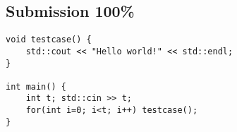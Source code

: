 \documentclass[12pt,letterpaper]{article}
\begin{document}
\small
\subsection*{Submission 100\%}
\begin{verbatim}
void testcase() {
    std::cout << "Hello world!" << std::endl;
}

int main() {
    int t; std::cin >> t;
    for(int i=0; i<t; i++) testcase();
}
\end{verbatim}
\end{document}
